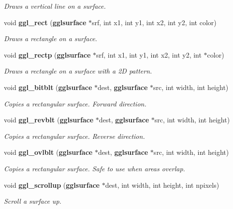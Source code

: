 \begin{CompactItemize}
\begin{CompactList}\small\item\em Draws a vertical line on a surface. \item\end{CompactList}\item 
void {\bf ggl\_\-rect} ({\bf gglsurface} $\ast$srf, int x1, int y1, int x2, int y2, int color)
\begin{CompactList}\small\item\em Draws a rectangle on a surface. \item\end{CompactList}\item 
void {\bf ggl\_\-rectp} ({\bf gglsurface} $\ast$srf, int x1, int y1, int x2, int y2, int $\ast$color)
\begin{CompactList}\small\item\em Draws a rectangle on a surface with a 2D pattern. \item\end{CompactList}\item 
void {\bf ggl\_\-bitblt} ({\bf gglsurface} $\ast$dest, {\bf gglsurface} $\ast$src, int width, int height)
\begin{CompactList}\small\item\em Copies a rectangular surface. Forward direction. \item\end{CompactList}\item 
void {\bf ggl\_\-revblt} ({\bf gglsurface} $\ast$dest, {\bf gglsurface} $\ast$src, int width, int height)
\begin{CompactList}\small\item\em Copies a rectangular surface. Reverse direction. \item\end{CompactList}\item 
void {\bf ggl\_\-ovlblt} ({\bf gglsurface} $\ast$dest, {\bf gglsurface} $\ast$src, int width, int height)
\begin{CompactList}\small\item\em Copies a rectangular surface. Safe to use when areas overlap. \item\end{CompactList}\item 
void {\bf ggl\_\-scrollup} ({\bf gglsurface} $\ast$dest, int width, int height, int npixels)
\begin{CompactList}\small\item\em Scroll a surface up. \item\end{CompactList}\item 

\end{CompactItemize}
